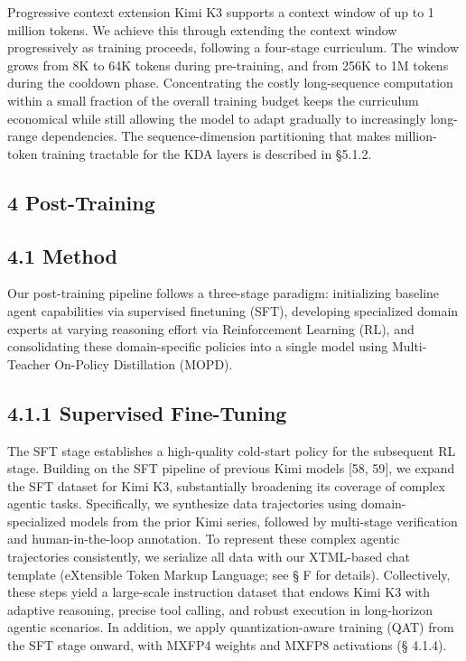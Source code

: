 \documentclass[
  10
]{article}
\begin{document}
Progressive context extension Kimi K3 supports a context window of up to
1 million tokens. We achieve this through extending the context window
progressively as training proceeds, following a four-stage curriculum.
The window grows from 8K to 64K tokens during pre-training, and from
256K to 1M tokens during the cooldown phase. Concentrating the costly
long-sequence computation within a small fraction of the overall
training budget keeps the curriculum economical while still allowing the
model to adapt gradually to increasingly long-range dependencies. The
sequence-dimension partitioning that makes million-token training
tractable for the KDA layers is described in §5.1.2.

\subsection{4 Post-Training}\label{post-training}

\subsection{4.1 Method}\label{method}

Our post-training pipeline follows a three-stage paradigm: initializing
baseline agent capabilities via supervised finetuning (SFT), developing
specialized domain experts at varying reasoning effort via Reinforcement
Learning (RL), and consolidating these domain-specific policies into a
single model using Multi-Teacher On-Policy Distillation (MOPD).

\subsection{4.1.1 Supervised Fine-Tuning}\label{supervised-fine-tuning}

The SFT stage establishes a high-quality cold-start policy for the
subsequent RL stage. Building on the SFT pipeline of previous Kimi
models {[}58, 59{]}, we expand the SFT dataset for Kimi K3,
substantially broadening its coverage of complex agentic tasks.
Specifically, we synthesize data trajectories using domain-specialized
models from the prior Kimi series, followed by multi-stage verification
and human-in-the-loop annotation. To represent these complex agentic
trajectories consistently, we serialize all data with our XTML-based
chat template (eXtensible Token Markup Language; see § F for details).
Collectively, these steps yield a large-scale instruction dataset that
endows Kimi K3 with adaptive reasoning, precise tool calling, and robust
execution in long-horizon agentic scenarios. In addition, we apply
quantization-aware training (QAT) from the SFT stage onward, with MXFP4
weights and MXFP8 activations (§ 4.1.4).
\end{document}
